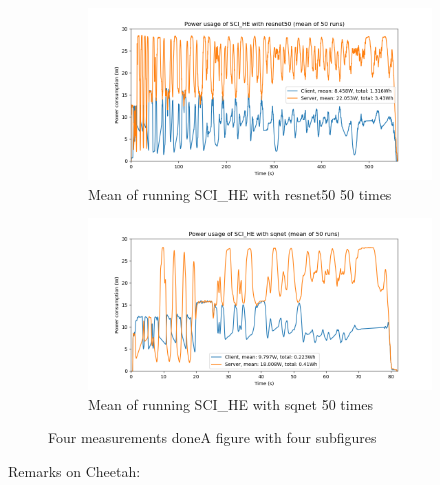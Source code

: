 \documentclass[../thesis.tex]{subfiles}
\begin{document}
\begin{figure}[htb]
    \begin{subfigure}{.475\linewidth}
            \includegraphics[width=\textwidth]{Thesis/Images/Means/mean_SCI_HE-resnet50.png}
            \caption{Mean of running SCI\_HE with resnet50 50 times}
            \label{fig:mean_SCI_HE_resnet50}
    \end{subfigure}\hfill %
    \begin{subfigure}{.475\linewidth}
            \includegraphics[width=\textwidth]{Thesis/Images/Means/mean_SCI_HE-sqnet.png}
            \caption{Mean of running SCI\_HE with sqnet 50 times}
            \label{fig:mean_SCI_HE_sqnet}
    \end{subfigure}

    \caption{Four measurements doneA figure with four subfigures}
    \label{fig:4results}
\end{figure}
Remarks on Cheetah:
\end{document}
